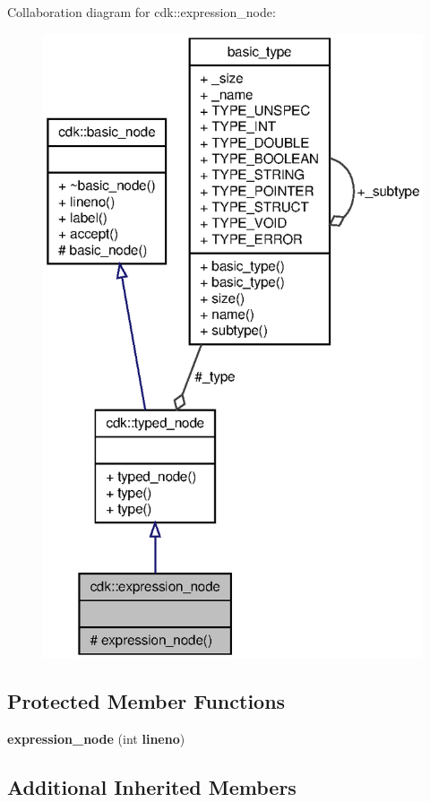 Collaboration diagram for cdk\+:\+:expression\+\_\+node\+:
\nopagebreak
\begin{figure}[H]
\begin{center}
\leavevmode
\includegraphics[width=322pt]{classcdk_1_1expression__node__coll__graph}
\end{center}
\end{figure}
\subsection*{Protected Member Functions}
\begin{DoxyCompactItemize}
\item 
\textbf{ expression\+\_\+node} (int \textbf{ lineno})
\end{DoxyCompactItemize}
\subsection*{Additional Inherited Members}


